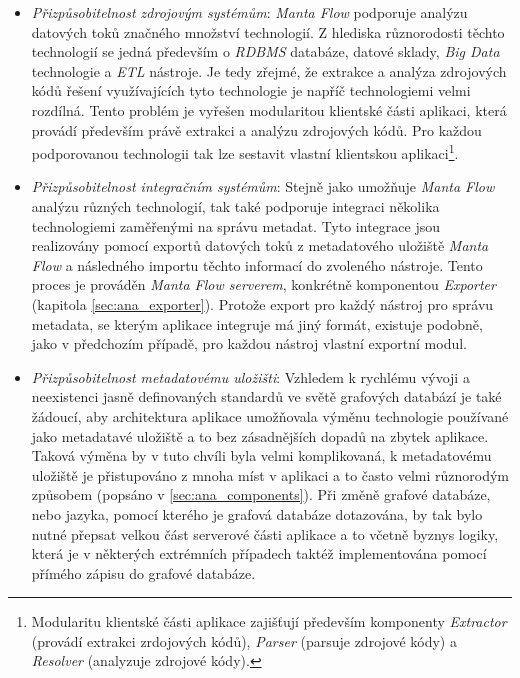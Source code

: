 \begin{itemize}
	\item{\textit{Přizpůsobitelnost zdrojovým systémům}}: \textit{Manta Flow} podporuje analýzu datových toků značného množství technologií. Z hlediska různorodosti těchto technologií se jedná především o \textit{RDBMS} databáze, datové sklady, \textit{Big Data} technologie a \textit{ETL} nástroje. Je tedy zřejmé, že extrakce a analýza zdrojových kódů řešení využívajících tyto technologie je napříč technologiemi velmi rozdílná. Tento problém je vyřešen modularitou klientské části aplikaci, která provádí především právě extrakci a analýzu zdrojových kódů. Pro každou podporovanou technologii tak lze sestavit vlastní klientskou aplikaci\footnote{Modularitu klientské části aplikace zajišťují především komponenty \textit{Extractor} (provádí extrakci zrdojových kódů), \textit{Parser} (parsuje zdrojové kódy) a \textit{Resolver} (analyzuje zdrojové kódy).}.

	\item{\textit{Přizpůsobitelnost integračním systémům}}: Stejně jako umožňuje \textit{Manta Flow} analýzu různých technologií, tak také podporuje integraci několika technologiemi zaměřenými na správu metadat. Tyto integrace jsou realizovány pomocí exportů datových toků z metadatového uložiště \textit{Manta Flow} a následného importu těchto informací do zvoleného nástroje. Tento proces je prováděn \textit{Manta Flow serverem}, konkrétně komponentou \textit{Exporter} (kapitola \ref{sec:ana_exporter}). Protože export pro každý nástroj pro správu metadata, se kterým aplikace integruje má jiný formát, existuje podobně, jako v předchozím případě, pro každou nástroj vlastní exportní modul.

	\item{\textit{Přizpůsobitelnost metadatovému uložišti}}: Vzhledem k rychlému vývoji a neexistenci jasně definovaných standardů ve světě grafových databází je také žádoucí, aby architektura aplikace umožňovala výměnu technologie používané jako metadatavé uložiště a to bez zásadnějších dopadů na zbytek aplikace. Taková výměna by v tuto chvíli byla velmi komplikovaná, k metadatovému uložiště je přistupováno z mnoha míst v aplikaci a to často velmi různorodým způsobem (popsáno v \ref{sec:ana_components}). Při změně grafové databáze, nebo jazyka, pomocí kterého je grafová databáze dotazována, by tak bylo nutné přepsat velkou část serverové části aplikace a to včetně byznys logiky, která je v některých extrémních případech taktéž implementována pomocí přímého zápisu do grafové databáze.


\end{itemize}
